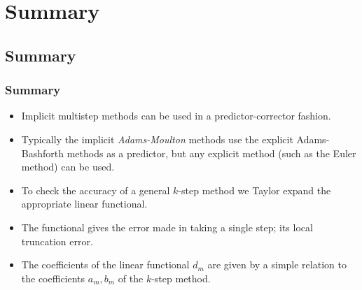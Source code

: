 \documentclass{beamer}
\begin{document}
\section{Summary}

\subsection{Summary}

\begin{frame}
  \frametitle{Summary}

  \begin{itemize}
  \item Implicit multistep methods can be used in a
    predictor-corrector fashion.
  \item Typically the implicit \emph{Adams-Moulton} methods use the
    explicit Adams-Bashforth methods as a predictor, but any explicit
    method (such as the Euler method) can be used.
  \item To check the accuracy of a general $k$-step method we Taylor
    expand the appropriate linear functional.
  \item The functional gives the error made in taking a single step;
    its local truncation error.
  \item The coefficients of the linear functional $d_m$ are given by a
    simple relation to the coefficients $a_m,b_m$ of the $k$-step
    method.
  \end{itemize}

\end{frame}
\end{document}
